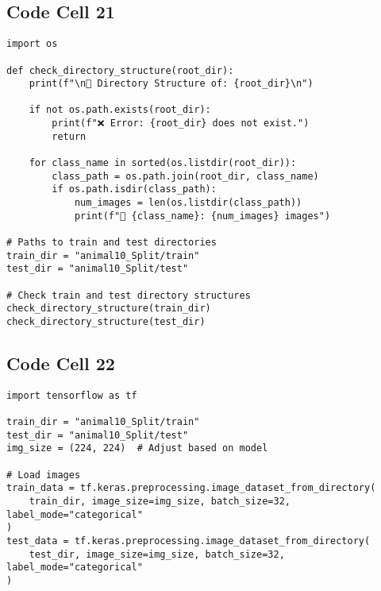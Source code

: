 \documentclass{article}
\begin{document}
\subsection*{Code Cell 21}
\begin{lstlisting}
import os

def check_directory_structure(root_dir):
    print(f"\n📂 Directory Structure of: {root_dir}\n")

    if not os.path.exists(root_dir):
        print(f"❌ Error: {root_dir} does not exist.")
        return

    for class_name in sorted(os.listdir(root_dir)):
        class_path = os.path.join(root_dir, class_name)
        if os.path.isdir(class_path):
            num_images = len(os.listdir(class_path))
            print(f"📁 {class_name}: {num_images} images")

# Paths to train and test directories
train_dir = "animal10_Split/train"
test_dir = "animal10_Split/test"

# Check train and test directory structures
check_directory_structure(train_dir)
check_directory_structure(test_dir)
\end{lstlisting}

\subsection*{Code Cell 22}
\begin{lstlisting}
import tensorflow as tf

train_dir = "animal10_Split/train"
test_dir = "animal10_Split/test"
img_size = (224, 224)  # Adjust based on model

# Load images
train_data = tf.keras.preprocessing.image_dataset_from_directory(
    train_dir, image_size=img_size, batch_size=32, label_mode="categorical"
)
test_data = tf.keras.preprocessing.image_dataset_from_directory(
    test_dir, image_size=img_size, batch_size=32, label_mode="categorical"
)
\end{lstlisting}
\end{document}
